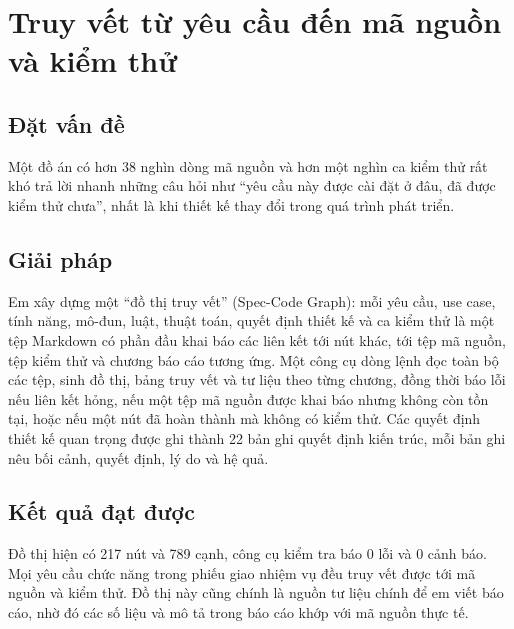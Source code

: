\section{Truy vết từ yêu cầu đến mã nguồn và kiểm thử}

\subsection{Đặt vấn đề}

Một đồ án có hơn 38 nghìn dòng mã nguồn và hơn một nghìn ca kiểm thử rất khó trả lời nhanh những câu hỏi như ``yêu cầu này được cài đặt ở đâu, đã được kiểm thử chưa'', nhất là khi thiết kế thay đổi trong quá trình phát triển.

\subsection{Giải pháp}

Em xây dựng một ``đồ thị truy vết'' (Spec-Code Graph): mỗi yêu cầu, use case, tính năng, mô-đun, luật, thuật toán, quyết định thiết kế và ca kiểm thử là một tệp Markdown có phần đầu khai báo các liên kết tới nút khác, tới tệp mã nguồn, tệp kiểm thử và chương báo cáo tương ứng. Một công cụ dòng lệnh đọc toàn bộ các tệp, sinh đồ thị, bảng truy vết và tư liệu theo từng chương, đồng thời báo lỗi nếu liên kết hỏng, nếu một tệp mã nguồn được khai báo nhưng không còn tồn tại, hoặc nếu một nút đã hoàn thành mà không có kiểm thử. Các quyết định thiết kế quan trọng được ghi thành 22 bản ghi quyết định kiến trúc, mỗi bản ghi nêu bối cảnh, quyết định, lý do và hệ quả.

\subsection{Kết quả đạt được}

Đồ thị hiện có 217 nút và 789 cạnh, công cụ kiểm tra báo 0 lỗi và 0 cảnh báo. Mọi yêu cầu chức năng trong phiếu giao nhiệm vụ đều truy vết được tới mã nguồn và kiểm thử. Đồ thị này cũng chính là nguồn tư liệu chính để em viết báo cáo, nhờ đó các số liệu và mô tả trong báo cáo khớp với mã nguồn thực tế.
